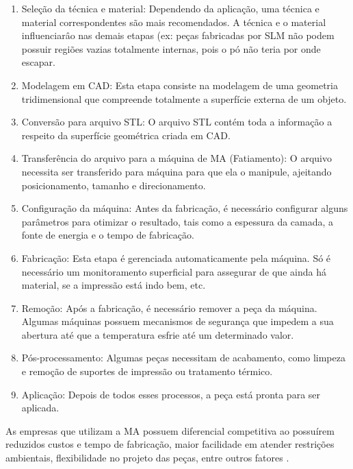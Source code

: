 \begin{enumerate}[start=0]
    \item Seleção da técnica e material: Dependendo da aplicação, uma técnica e material correspondentes são mais recomendados. A técnica e o material influenciarâo nas demais etapas (ex: peças fabricadas por SLM não podem possuir regiões vazias totalmente internas, pois o pó não teria por onde escapar.

    \item Modelagem em CAD: Esta etapa consiste na modelagem de uma geometria tridimensional que compreende totalmente a superfície externa de um objeto.

    \item Conversão para arquivo STL: O arquivo STL contém toda a informação a respeito da superfície geométrica criada em CAD.

    \item Transferência do arquivo para a máquina de MA (Fatiamento): O arquivo necessita ser transferido para máquina para que ela o manipule, ajeitando posicionamento, tamanho e direcionamento.

    \item Configuração da máquina: Antes da fabricação, é necessário configurar alguns parâmetros para otimizar o resultado, tais como  a espessura da camada, a fonte de energia e o tempo de fabricação.
    
    \item Fabricação: Esta etapa é gerenciada automaticamente pela máquina. Só é necessário um monitoramento superficial para assegurar de que ainda há material, se a impressão está indo bem, etc.

    \item Remoção: Após a fabricação, é necessário remover a peça da máquina. Algumas máquinas possuem mecanismos de segurança que impedem a sua abertura até que a temperatura esfrie até um determinado valor.

    \item Pós-processamento: Algumas peças necessitam de acabamento, como limpeza e remoção de suportes de impressão ou tratamento térmico.

    \item Aplicação: Depois de todos esses processos, a peça está pronta para ser aplicada.
\end{enumerate}

As empresas que utilizam a MA possuem diferencial competitiva ao possuírem reduzidos custos e tempo de fabricação, maior facilidade em atender restrições ambientais, flexibilidade no projeto das peças, entre outros fatores \cite{srinivas2017critical}.

